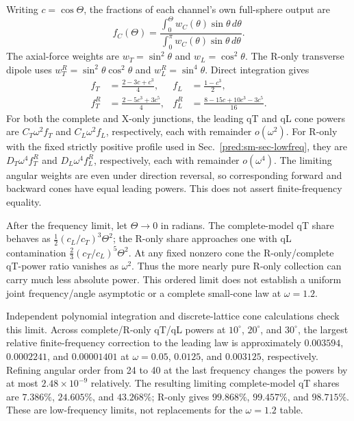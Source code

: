 \documentclass[10pt,aps,onecolumn,notitlepage,nofootinbib]{revtex4-2}
\begin{document}
Writing $c=\cos\Theta$, the fractions of each channel's own full-sphere output are
\begin{equation}
 f_C(\Theta)=\frac{\int_0^\Theta w_C(\theta)\sin\theta\,d\theta}
 {\int_0^\pi w_C(\theta)\sin\theta\,d\theta}.
\end{equation}
The axial-force weights are $w_T=\sin^2\theta$ and $w_L=\cos^2\theta$. The R-only transverse dipole uses $w_T^R=\sin^2\theta\cos^2\theta$ and $w_L^R=\sin^4\theta$. Direct integration gives
\begin{align}
 f_T&=\frac{2-3c+c^3}{4},
 &f_L&=\frac{1-c^3}{2},\nonumber\\
 f_T^R&=\frac{2-5c^3+3c^5}{4},
 &f_L^R&=\frac{8-15c+10c^3-3c^5}{16}.
 \label{pred:sm-eq-cone-fractions}
\end{align}
For both the complete and X-only junctions, the leading qT and qL cone powers are $C_T\omega^2 f_T$ and $C_L\omega^2 f_L$, respectively, each with remainder $o(\omega^2)$. For R-only with the fixed strictly positive profile used in Sec.~\ref{pred:sm-sec-lowfreq}, they are $D_T\omega^4 f_T^R$ and $D_L\omega^4 f_L^R$, respectively, each with remainder $o(\omega^4)$. The limiting angular weights are even under direction reversal, so corresponding forward and backward cones have equal leading powers. This does not assert finite-frequency equality.

After the frequency limit, let $\Theta\to0$ in radians. The complete-model qT share behaves as $\tfrac12(c_L/c_T)^3\Theta^2$; the R-only share approaches one with qL contamination $\tfrac23(c_T/c_L)^5\Theta^2$. At any fixed nonzero cone the R-only/complete qT-power ratio vanishes as $\omega^2$. Thus the more nearly pure R-only collection can carry much less absolute power. This ordered limit does not establish a uniform joint frequency/angle asymptotic or a complete small-cone law at $\omega=1.2$.

Independent polynomial integration and discrete-lattice cone calculations check this limit. Across complete/R-only qT/qL powers at $10^\circ$, $20^\circ$, and $30^\circ$, the largest relative finite-frequency correction to the leading law is approximately $0.003594$, $0.0002241$, and $0.00001401$ at $\omega=0.05$, $0.0125$, and $0.003125$, respectively. Refining angular order from 24 to 40 at the last frequency changes the powers by at most $2.48\times10^{-9}$ relatively. The resulting limiting complete-model qT shares are $7.386\%$, $24.605\%$, and $43.268\%$; R-only gives $99.868\%$, $99.457\%$, and $98.715\%$. These are low-frequency limits, not replacements for the $\omega=1.2$ table.
\end{document}
